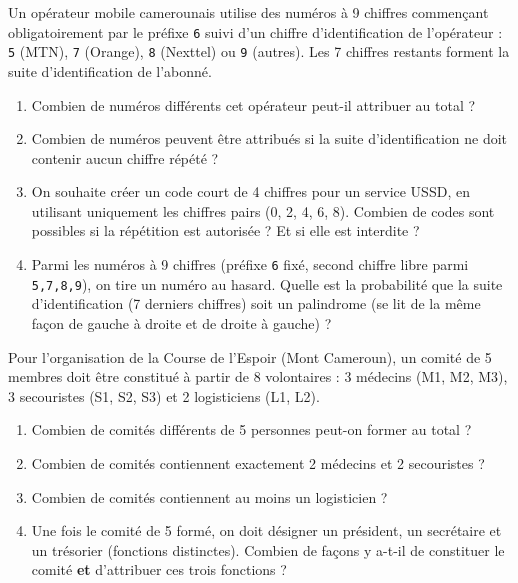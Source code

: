\documentclass[11pt]{article}
\begin{document}
\begin{exercice}
Un opérateur mobile camerounais utilise des numéros à \num{9} chiffres commençant obligatoirement par le préfixe \texttt{6} suivi d'un chiffre d'identification de l'opérateur : \texttt{5} (MTN), \texttt{7} (Orange), \texttt{8} (Nexttel) ou \texttt{9} (autres). Les \num{7} chiffres restants forment la suite d'identification de l'abonné.
\begin{enumerate}
    \item Combien de numéros différents cet opérateur peut-il attribuer au total ?
    \item Combien de numéros peuvent être attribués si la suite d'identification ne doit contenir aucun chiffre répété ?
    \item On souhaite créer un code court de \num{4} chiffres pour un service USSD, en utilisant uniquement les chiffres pairs (0, 2, 4, 6, 8). Combien de codes sont possibles si la répétition est autorisée ? Et si elle est interdite ?
    \item Parmi les numéros à \num{9} chiffres (préfixe \texttt{6} fixé, second chiffre libre parmi \texttt{5,7,8,9}), on tire un numéro au hasard. Quelle est la probabilité que la suite d'identification (7 derniers chiffres) soit un palindrome (se lit de la même façon de gauche à droite et de droite à gauche) ?
\end{enumerate}
\end{exercice}

\begin{exercice}
Pour l'organisation de la Course de l'Espoir (Mont Cameroun), un comité de \num{5} membres doit être constitué à partir de \num{8} volontaires : \num{3} médecins (M1, M2, M3), \num{3} secouristes (S1, S2, S3) et \num{2} logisticiens (L1, L2).
\begin{enumerate}
    \item Combien de comités différents de \num{5} personnes peut-on former au total ?
    \item Combien de comités contiennent exactement \num{2} médecins et \num{2} secouristes ?
    \item Combien de comités contiennent au moins un logisticien ?
    \item Une fois le comité de \num{5} formé, on doit désigner un président, un secrétaire et un trésorier (fonctions distinctes). Combien de façons y a-t-il de constituer le comité \textbf{et} d'attribuer ces trois fonctions ?
\end{enumerate}
\end{exercice}
\end{document}
